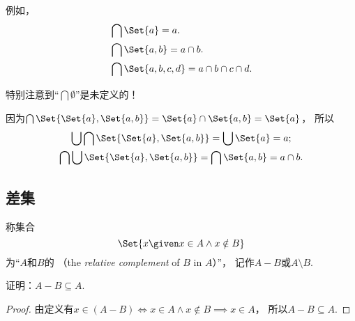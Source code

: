 例如，
\begin{align*}
	&\bigcap\Set{a} = a. \\
	&\bigcap\Set{a,b} = a \cap b. \\
	&\bigcap\Set{a,b,c,d} = a \cap b \cap c \cap d.
\end{align*}

\begin{remark}
特别注意到“\(\bigcap\emptyset\)”是未定义的！
\end{remark}

\begin{example}
因为\(\bigcap\Set{ \Set{a}, \Set{a,b} } = \Set{a} \cap \Set{a,b} = \Set{a}\)，
所以\begin{gather*}
	\bigcup \bigcap \Set{ \Set{a}, \Set{a,b} } = \bigcup \Set{a} = a; \\
	\bigcap \bigcup \Set{ \Set{a}, \Set{a,b} } = \bigcap \Set{a,b} = a \cap b.
\end{gather*}
\end{example}

\subsection{差集}
\begin{definition}
称集合\begin{equation*}
	\Set{ x \given x \in A \land x \notin B }
\end{equation*}为“\(A\)和\(B\)的%
（the \emph{relative complement} of \(B\) in \(A\)）”，
记作\(A - B\)或\(A \setminus B\).
\end{definition}

\begin{example}
证明：\(A - B \subseteq A\).
\begin{proof}
由定义有\(
	x \in (A - B)
	\iff  %
	x \in A \land x \notin B
	\implies  %
	x \in A
\)，
所以\(A - B \subseteq A\).
\end{proof}
\end{example}

